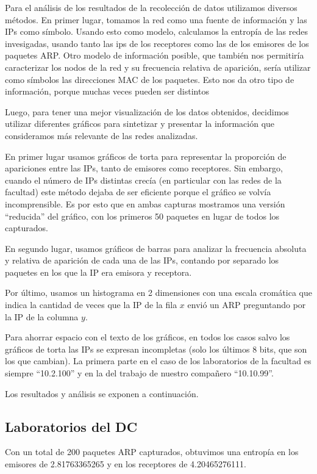 Para el análisis de los resultados de la recolección de datos utilizamos
diversos métodos. En primer lugar, tomamos la red como una fuente de
información y las IPs como símbolo. Usando esto como modelo, calculamos la
entropía de las redes invesigadas, usando tanto las ips de los receptores como
las de los emisores de los paquetes ARP. Otro modelo de información posible,
que también nos permitiría caracterizar los nodos de la red y su frecuencia
relativa de aparición, sería utilizar como símbolos las direcciones MAC de los
paquetes. Esto nos da otro tipo de información, porque muchas veces pueden ser
distintos 

Luego, para tener una mejor visualización de los datos obtenidos, decidimos
utilizar diferentes gráficos para sintetizar y presentar la información que
consideramos más relevante de las redes analizadas.

En primer lugar usamos gráficos de torta para representar la proporción de
apariciones entre las IPs, tanto de emisores como receptores. Sin embargo,
cuando el número de IPs distintas crecía (en particular con las redes de la
facultad) este método dejaba de ser eficiente porque el gráfico se volvía
incomprensible. Es por esto que en ambas capturas mostramos una versión
``reducida'' del gráfico, con los primeros 50 paquetes en lugar de todos
los capturados.

En segundo lugar, usamos gráficos de barras para analizar la frecuencia
absoluta y relativa de aparición de cada una de las IPs, contando por separado
los paquetes en los que la IP era emisora y receptora.

Por último, usamos un histograma en 2 dimensiones con una escala cromática
que indica la cantidad de veces que la IP de la fila $x$ envió un ARP
preguntando por la IP de la columna $y$.

Para ahorrar espacio con el texto de los gráficos, en todos los casos salvo los
gráficos de torta las IPs se expresan incompletas (solo los últimos 8 bits, que
son los que cambian). La primera parte en el caso de los laboratorios de la
facultad es siempre ``10.2.100'' y en la del trabajo de nuestro compañero
``10.10.99''.

Los resultados y análisis se exponen a continuación.

\subsection{Laboratorios del DC}

Con un total de 200 paquetes ARP capturados, obtuvimos una entropía en los
emisores de 2.81763365265 y en los receptores de 4.20465276111.

